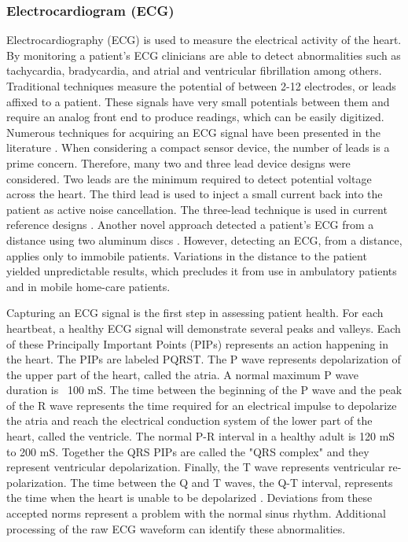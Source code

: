 \subsubsection{Electrocardiogram (ECG)}
\label{subsubsec:Electrocardiogram}
Electrocardiography (ECG) is used to measure the electrical activity of the heart. By monitoring a patient's ECG clinicians are able to detect abnormalities such as tachycardia, bradycardia, and atrial and ventricular fibrillation among others. Traditional techniques measure the potential of between 2-12 electrodes, or leads affixed to a patient. These signals have very small potentials between them and require an analog front end to produce readings, which can be easily digitized. Numerous techniques for acquiring an ECG signal have been presented in the literature \cite{Kim2011} \cite{Yan2011} \cite{Faggion2011} \cite{Secerbegovic2011}.  When considering a compact sensor device, the number of leads is a prime concern. Therefore, many two and three lead device designs were considered. Two leads are the minimum required to detect potential voltage across the heart. The third lead is used to inject a small current back into the patient as active noise cancellation. The three-lead technique is used in current reference designs \cite{TI2006} . Another novel approach detected a patient's ECG from a distance using two aluminum discs \cite{Belgacem2011}. However, detecting an ECG, from a distance, applies only to immobile patients. Variations in the distance to the patient yielded unpredictable results, which precludes it from use in ambulatory patients and in mobile home-care patients. 

Capturing an ECG signal is the first step in assessing patient health. For each heartbeat, a healthy ECG signal will demonstrate several peaks and valleys. Each of these Principally Important Points (PIPs) represents an action happening in the heart. The PIPs are labeled PQRST. The P wave represents depolarization of the upper part of the heart, called the atria. A normal maximum P wave duration is ~100 mS. The time between the beginning of the P wave and the peak of the R wave represents the time required for an electrical impulse to depolarize the atria and reach the electrical conduction system of the lower part of the heart, called the ventricle. The normal P-R interval in a healthy adult is 120 mS to 200 mS. Together the QRS PIPs are called the "QRS complex" and they represent ventricular depolarization. Finally, the T wave represents ventricular re-polarization. The time between the Q and T waves, the Q-T interval, represents the time when the heart is unable to be depolarized \cite{Khorovets2000}. Deviations from these accepted norms represent a problem with the normal sinus rhythm. Additional processing of the raw ECG waveform can identify these abnormalities.

